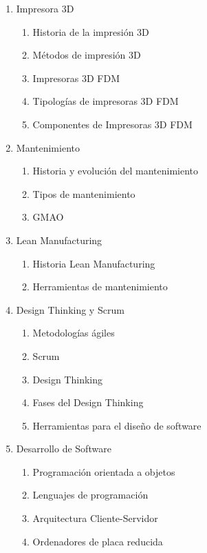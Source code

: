 		\begin{enumerate}
			\item Impresora 3D
				\begin{enumerate}
					\item Historia de la impresión 3D	
					\item Métodos de impresión 3D
					\item Impresoras 3D FDM
					\item Tipologías de impresoras 3D FDM 
					\item Componentes de Impresoras 3D FDM	
				\end{enumerate}
			\item Mantenimiento
				\begin{enumerate}
					\item Historia y evolución del mantenimiento
					\item Tipos de mantenimiento
					\item GMAO 
					
				\end{enumerate}					
			\item Lean Manufacturing
				\begin{enumerate}
					\item Historia Lean Manufacturing
					\item Herramientas de mantenimiento
				\end{enumerate}
			\item Design Thinking y Scrum
				\begin{enumerate}
					\item Metodologías ágiles 
					\item Scrum 					
					\item Design Thinking
					\item Fases del Design Thinking
					\item Herramientas para el diseño de software
				\end{enumerate}
			\item Desarrollo de Software
				\begin{enumerate}	
					\item Programación orientada a objetos
					\item Lenguajes de programación
					\item Arquitectura Cliente-Servidor
					\item Ordenadores de placa reducida 
				\end{enumerate}						
		\end{enumerate}
		
